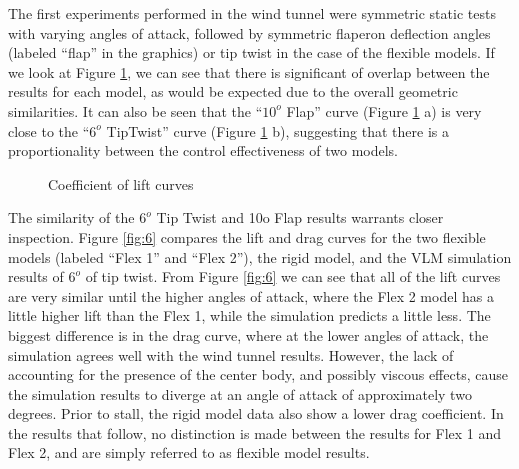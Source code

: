 \documentclass[11pt]{ucthesis}
\begin{document}
The first experiments performed in the wind tunnel were symmetric static tests with varying angles of attack, followed by symmetric flaperon deflection angles (labeled “flap” in the graphics) or tip twist in the case of the flexible models. If we look at Figure \ref{fig:CL}, we can see that there is significant of overlap between the results for each model, as would be expected due to the overall geometric similarities. It can also be seen that the “$10^o$ Flap” curve (Figure \ref{fig:CL} a) is very close to the “$6^o$ TipTwist” curve (Figure \ref{fig:CL} b), suggesting that there is a proportionality between the control effectiveness of two models.

\begin{figure}[thpb]
\hfill
{}
\hfill
{}
\hfill
\caption{Coefficient of lift curves}
\label{fig:CL}
\end{figure}

The similarity of the $6^o$ Tip Twist and 10o Flap results warrants closer inspection. Figure \ref{fig:6} compares the lift and drag curves for the two flexible models (labeled “Flex 1” and “Flex 2”), the rigid model, and the VLM simulation results of $6^o$ of tip twist. From Figure \ref{fig:6} we can see that all of the lift curves are very similar until the higher angles of attack, where the Flex 2 model has a little higher lift than the Flex 1, while the simulation predicts a little less. The biggest difference is in the drag curve, where at the lower angles of attack, the simulation agrees well with the wind tunnel results. However, the lack of accounting for the presence of the center body, and possibly viscous effects, cause the simulation results to diverge at an angle of attack of approximately two degrees. Prior to stall, the rigid model data also show a lower drag coefficient.  In the results that follow, no distinction is made between the results for Flex 1 and Flex 2, and are simply referred to as flexible model results.
\end{document}
